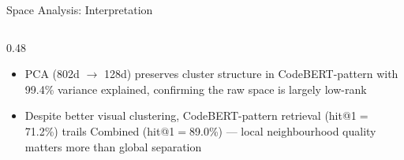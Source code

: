 \documentclass[aspectratio=169,10pt]{beamer}
\begin{document}
\begin{frame}{Space Analysis: Interpretation}
\begin{columns}[T]
\begin{column}{0.48\textwidth}
{\begin{itemize}
      \item[\textcolor{c5}{\faIcon{compress-arrows-alt}}]
        PCA (802d $\to$ 128d) preserves cluster structure
        in CodeBERT-pattern with 99.4\% variance explained,
        confirming the raw space is largely low-rank

      \item[\textcolor{c1}{\faIcon{chart-bar}}]
        Despite better visual clustering, CodeBERT-pattern
        retrieval (hit@1$=$71.2\%) trails Combined
        (hit@1$=$89.0\%) --- local neighbourhood quality
        matters more than global separation
    \end{itemize}}

  \end{column}
  \end{columns}

\end{frame}
\end{document}
